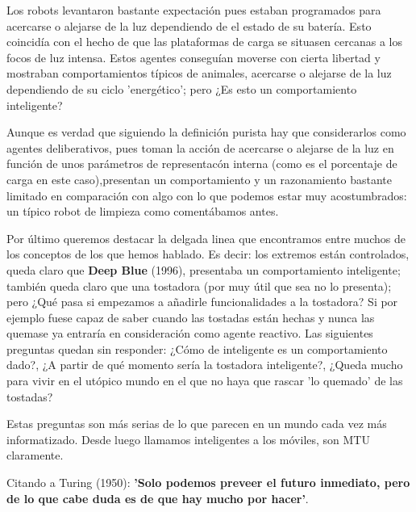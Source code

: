 \vspace{10px}

Los robots levantaron bastante expectación pues estaban programados para acercarse o alejarse de la luz dependiendo de el estado de su batería. Esto coincidía con el hecho de que las plataformas de carga se situasen cercanas a los focos de luz intensa. Estos agentes conseguían moverse con cierta libertad y mostraban comportamientos típicos de animales, acercarse o alejarse de la luz dependiendo de su ciclo 'energético'; pero ¿Es esto un comportamiento inteligente?

\vspace{10px}

Aunque es verdad que siguiendo la definición purista hay que considerarlos como agentes deliberativos, pues toman la acción de acercarse o alejarse de la luz en función de unos parámetros de representacón interna (como es el porcentaje de carga en este caso),presentan un comportamiento y un razonamiento bastante limitado en comparación con algo con lo que podemos estar muy acostumbrados: un típico robot de limpieza como comentábamos antes.

\vspace{10px}

Por último queremos destacar la delgada linea que encontramos entre muchos de los conceptos de los que hemos hablado. Es decir: los extremos están controlados, queda claro que \textbf{Deep Blue} (1996), presentaba un comportamiento inteligente; también queda claro que una tostadora (por muy útil que sea no lo presenta); pero ¿Qué pasa si empezamos a añadirle funcionalidades a la tostadora? Si por ejemplo fuese capaz de saber cuando las tostadas están hechas y nunca las quemase ya entraría en consideración como agente reactivo. Las siguientes preguntas quedan sin responder: ¿Cómo de inteligente es un comportamiento dado?, ¿A partir de qué momento sería la tostadora inteligente?, ¿Queda mucho para vivir en el utópico mundo en el que no haya que rascar 'lo quemado' de las tostadas?

\vspace{10px}

Estas preguntas son más serias de lo que parecen en un mundo cada vez más informatizado. Desde luego llamamos inteligentes a los móviles, son MTU claramente. 

\vspace{10px}

Citando a Turing (1950): \textbf{'Solo podemos preveer el futuro inmediato, pero de lo que cabe duda es de que hay mucho por hacer'}.



\newpage
	
